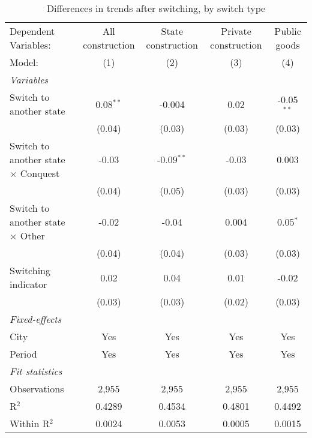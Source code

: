 \begin{table}[htbp]
   \caption{\label{tab:baseline_100y} Differences in trends after switching, by switch type}
   \centering
   \begin{tabular}{lcccc}
      \tabularnewline \midrule \midrule
      Dependent Variables:                       & All construction & State construction & Private construction & Public goods\\  
      Model:                                     & (1)              & (2)                & (3)                  & (4)\\  
      \midrule
      \emph{Variables}\\
      Switch to another state                    & 0.08$^{**}$      & -0.004             & 0.02                 & -0.05$^{**}$\\   
                                                 & (0.04)           & (0.03)             & (0.03)               & (0.03)\\   
      Switch to another state $\times$ Conquest  & -0.03            & -0.09$^{**}$       & -0.03                & 0.003\\   
                                                 & (0.04)           & (0.05)             & (0.03)               & (0.03)\\   
      Switch to another state $\times$ Other     & -0.02            & -0.04              & 0.004                & 0.05$^{*}$\\   
                                                 & (0.04)           & (0.04)             & (0.03)               & (0.03)\\   
      Switching indicator                        & 0.02             & 0.04               & 0.01                 & -0.02\\   
                                                 & (0.03)           & (0.03)             & (0.02)               & (0.03)\\   
      \midrule
      \emph{Fixed-effects}\\
      City                                       & Yes              & Yes                & Yes                  & Yes\\  
      Period                                     & Yes              & Yes                & Yes                  & Yes\\  
      \midrule
      \emph{Fit statistics}\\
      Observations                               & 2,955            & 2,955              & 2,955                & 2,955\\  
      R$^2$                                      & 0.4289           & 0.4534             & 0.4801               & 0.4492\\  
      Within R$^2$                               & 0.0024           & 0.0053             & 0.0005               & 0.0015\\  
      \midrule \midrule
      

\end{tabular}
\end{table}
